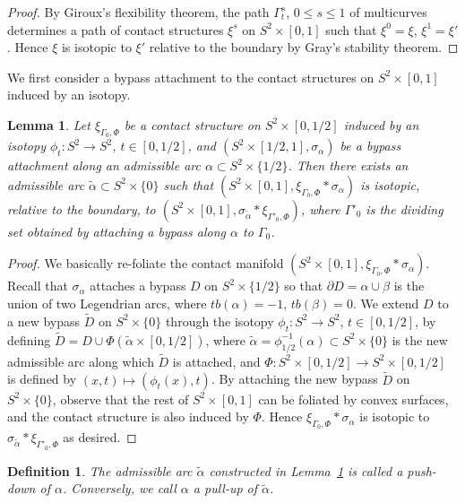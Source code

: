 \documentclass[12pt]{amsart}
\newtheorem{defn}[thm]{Definition}
\newtheorem{lemma}[thm]{Lemma}
\theoremstyle{remark}
\newcommand{\bdry}{\partial}
\begin{document}
\begin{proof}
By Giroux's flexibility theorem, the path $\Gamma^s_t$, $0\leq s\leq1$ of multicurves determines a path of contact structures $\xi^s$ on $S^2\times[0,1]$ such that $\xi^0=\xi$, $\xi^1=\xi'$. Hence $\xi$ is isotopic to $\xi'$ relative to the boundary by Gray's stability theorem.
\end{proof}

We first consider a bypass attachment to the contact structures on $S^2\times[0,1]$ induced by an isotopy.

\begin{lemma} \label{DesAscBypass}
Let $\xi_{\Gamma_0,\Phi}$ be a contact structure on $S^2\times[0,1/2]$ induced by an isotopy $\phi_t:S^2 \to S^2$, $t\in[0,1/2]$, and $(S^2\times[1/2,1],\sigma_\alpha)$ be a bypass attachment along an admissible arc $\alpha\subset S^2\times\{1/2\}$. Then there exists an admissible arc $\tilde\alpha\subset S^2\times\{0\}$ such that $(S^2\times[0,1],\xi_{\Gamma_0,\Phi} \ast \sigma_\alpha)$ is isotopic, relative to the boundary, to $(S^2\times[0,1],\sigma_{\tilde\alpha} \ast \xi_{\Gamma'_0,\Phi})$, where $\Gamma'_0$ is the dividing set obtained by attaching a bypass along $\alpha$ to $\Gamma_0$.
\end{lemma}

\begin{proof}
We basically re-foliate the contact manifold $(S^2\times[0,1],\xi_{\Gamma_0,\Phi} \ast \sigma_\alpha)$. Recall that $\sigma_\alpha$ attaches a bypass $D$ on $S^2\times\{1/2\}$ so that $\bdry D=\alpha\cup\beta$ is the union of two Legendrian arcs, where $tb(\alpha)=-1$, $tb(\beta)=0$. We extend $D$ to a new bypass $\tilde D$ on $S^2\times\{0\}$ through the isotopy $\phi_t:S^2 \to S^2$, $t\in[0,1/2]$, by defining $\tilde D=D \cup \Phi(\tilde\alpha\times[0,1/2])$, where $\tilde\alpha=\phi_{1/2}^{-1}(\alpha)\subset S^2\times\{0\}$ is the new admissible arc along which $\tilde D$ is attached, and $\Phi:S^2\times[0,1/2] \to S^2\times[0,1/2]$ is defined by $(x,t)\mapsto(\phi_t(x),t)$. By attaching the new bypass $\tilde D$ on $S^2\times\{0\}$, observe that the rest of $S^2\times[0,1]$ can be foliated by convex surfaces, and the contact structure is also induced by $\Phi$. Hence $\xi_{\Gamma_0,\Phi}\ast\sigma_\alpha$ is isotopic to $\sigma_{\tilde\alpha}\ast\xi_{\Gamma'_0,\Phi}$ as desired.
\end{proof}

\begin{defn}
The admissible arc $\tilde\alpha$ constructed in Lemma~\ref{DesAscBypass} is called a {\em push-down} of $\alpha$. Conversely, we call $\alpha$ a {\em pull-up} of $\tilde\alpha$.
\end{defn}
\end{document}
